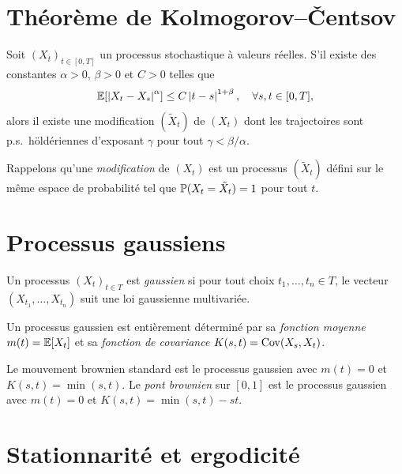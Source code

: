 \section{Th\'eor\`eme de Kolmogorov--\v{C}entsov}

\begin{theoreme}
\label{thm:kolmogorov_centsov}
Soit $(X_t)_{t \in [0,T]}$ un processus stochastique \`a valeurs r\'eelles.
S'il existe des constantes $\alpha > 0$, $\beta > 0$ et $C > 0$ telles que
\[
  \mathbb{E}[\left| X_t - X_s \right|^{\alpha}] \leq C \left| t - s \right|^{1 + \beta}, \quad \forall s, t \in [0, T],
\]
alors il existe une modification $(\tilde{X}_t)$ de $(X_t)$ dont les trajectoires
sont p.s.\ h\"old\'eriennes d'exposant $\gamma$ pour tout $\gamma < \beta/\alpha$.
\end{theoreme}

\begin{remarque}
Rappelons qu'une \emph{modification} de $(X_t)$ est un processus $(\tilde{X}_t)$
d\'efini sur le m\^eme espace de probabilit\'e tel que $\mathbb{P}(X_t = \tilde{X}_t) = 1$
pour tout $t$.
\end{remarque}

\section{Processus gaussiens}

\begin{definition}
Un processus $(X_t)_{t \in T}$ est \emph{gaussien} si pour tout choix
$t_1, \ldots, t_n \in T$, le vecteur $(X_{t_1}, \ldots, X_{t_n})$ suit une loi
gaussienne multivari\'ee.

Un processus gaussien est enti\`erement d\'etermin\'e par sa \emph{fonction moyenne}
$m(t) = \mathbb{E}[X_t]$ et sa \emph{fonction de covariance}
$K(s, t) = \mathrm{Cov}(X_s, X_t)$.
\end{definition}

\begin{exemple}
Le mouvement brownien standard est le processus gaussien avec $m(t) = 0$ et
$K(s, t) = \min(s, t)$. Le \emph{pont brownien} sur $[0, 1]$ est le processus
gaussien avec $m(t) = 0$ et $K(s, t) = \min(s, t) - st$.
\end{exemple}

\section{Stationnarit\'e et ergodicit\'e}

